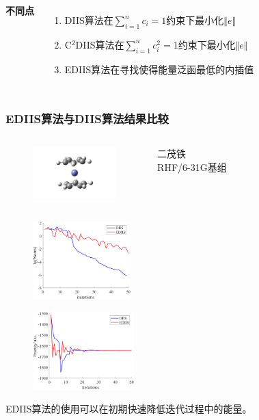 \documentclass[10pt,aspectratio=43,mathserif,UTF8]{beamer}
\begin{document}
\begin{frame}
\begin{columns}
		\textbf{不同点}
		\begin{enumerate}
		\item DIIS算法在$\sum_{i=1}^n c_i = 1$约束下最小化$\Vert e \Vert$
		\item C$^2$DIIS算法在$\sum_{i=1}^n c_i^2 = 1$约束下最小化$\Vert e \Vert$
		\item EDIIS算法在寻找使得能量泛函最低的内插值
		\end{enumerate}
		
		
	\end{columns}

\end{frame}



\begin{frame}
	\frametitle{EDIIS算法与DIIS算法结果比较}
	\begin{columns}[c]
		\begin{figure}[htbp]
			\centering
			\includegraphics[height=2cm]{figure/ferrocene/ferrocene2.jpg}
		\end{figure}

		二茂铁\\
		RHF/6-31G基组
	\end{columns}

	\begin{figure}[ht!]
		\centering
		\begin{minipage}{0.4\linewidth}
			\centering
			\includegraphics[height=3cm]{figure/ferrocene/logNorm4.png}
			\label{fig:ferrocene:lognorm}
		\end{minipage}
		\begin{minipage}{0.4\linewidth}
			\centering
			\includegraphics[height=3cm]{figure/ferrocene/E4.png}
			\label{fig:ferrocene:E}
		\end{minipage}
		\label{fig:ferrocene}
	\end{figure}
	\centerline{EDIIS算法的使用可以在初期快速降低迭代过程中的能量。}
\end{frame}
\end{document}
